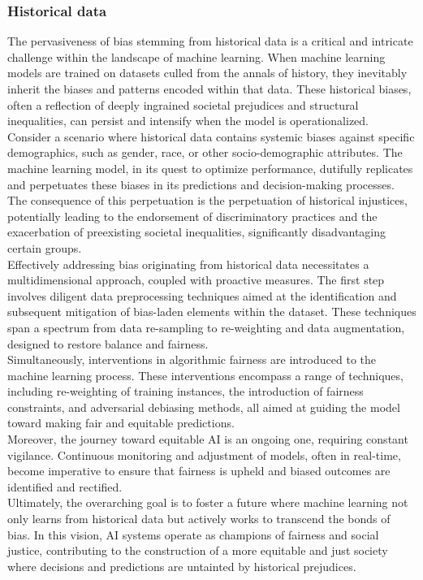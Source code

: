 \documentclass[12pt,a4paper,openright,twoside]{book}
\begin{document}
\subsubsection{Historical data}
The pervasiveness of bias stemming from historical data is a critical and intricate challenge within the landscape of machine learning. When machine learning models are trained on datasets culled from the annals of history, they inevitably inherit the biases and patterns encoded within that data. These historical biases, often a reflection of deeply ingrained societal prejudices and structural inequalities, can persist and intensify when the model is operationalized. \\
Consider a scenario where historical data contains systemic biases against specific demographics, such as gender, race, or other socio-demographic attributes. The machine learning model, in its quest to optimize performance, dutifully replicates and perpetuates these biases in its predictions and decision-making processes. The consequence of this perpetuation is the perpetuation of historical injustices, potentially leading to the endorsement of discriminatory practices and the exacerbation of preexisting societal inequalities, significantly disadvantaging certain groups. \cite{10.1145/3308560.3317590} \\
Effectively addressing bias originating from historical data necessitates a multidimensional approach, coupled with proactive measures. The first step involves diligent data preprocessing techniques aimed at the identification and subsequent mitigation of bias-laden elements within the dataset. These techniques span a spectrum from data re-sampling to re-weighting and data augmentation, designed to restore balance and fairness.  \\
Simultaneously, interventions in algorithmic fairness are introduced to the machine learning process. These interventions encompass a range of techniques, including re-weighting of training instances, the introduction of fairness constraints, and adversarial debiasing methods, all aimed at guiding the model toward making fair and equitable predictions. \\
Moreover, the journey toward equitable AI is an ongoing one, requiring constant vigilance. Continuous monitoring and adjustment of models, often in real-time, become imperative to ensure that fairness is upheld and biased outcomes are identified and rectified. \\
Ultimately, the overarching goal is to foster a future where machine learning not only learns from historical data but actively works to transcend the bonds of bias. In this vision, AI systems operate as champions of fairness and social justice, contributing to the construction of a more equitable and just society where decisions and predictions are untainted by historical prejudices.
\end{document}

